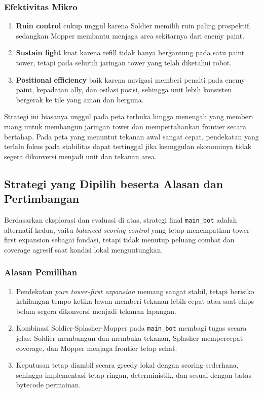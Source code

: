 \subsubsection{Efektivitas Mikro}

\begin{enumerate}
    \item \textbf{Ruin control} cukup unggul karena Soldier memilih ruin paling prospektif, sedangkan Mopper membantu menjaga area sekitarnya dari enemy paint.
    \item \textbf{Sustain fight} kuat karena refill tidak hanya bergantung pada satu paint tower, tetapi pada seluruh jaringan tower yang telah diketahui robot.
    \item \textbf{Positional efficiency} baik karena navigasi memberi penalti pada enemy paint, kepadatan ally, dan osilasi posisi, sehingga unit lebih konsisten bergerak ke tile yang aman dan berguna.
\end{enumerate}

Strategi ini biasanya unggul pada peta terbuka hingga menengah yang memberi ruang untuk membangun jaringan tower dan mempertahankan frontier secara bertahap. Pada peta yang menuntut tekanan awal sangat cepat, pendekatan yang terlalu fokus pada stabilitas dapat tertinggal jika keunggulan ekonominya tidak segera dikonversi menjadi unit dan tekanan area.

\subsection{Strategi yang Dipilih beserta Alasan dan Pertimbangan}

Berdasarkan eksplorasi dan evaluasi di atas, strategi final \texttt{main\_bot} adalah alternatif kedua, yaitu \textit{balanced scoring control} yang tetap menempatkan tower-first expansion sebagai fondasi, tetapi tidak menutup peluang combat dan coverage agresif saat kondisi lokal menguntungkan.

\subsubsection{Alasan Pemilihan}

\begin{enumerate}
    \item Pendekatan \textit{pure tower-first expansion} memang sangat stabil, tetapi berisiko kehilangan tempo ketika lawan memberi tekanan lebih cepat atau saat chips belum segera dikonversi menjadi tekanan lapangan.
    \item Kombinasi Soldier-Splasher-Mopper pada \texttt{main\_bot} membagi tugas secara jelas: Soldier membangun dan membuka tekanan, Splasher mempercepat coverage, dan Mopper menjaga frontier tetap sehat.
    \item Keputusan tetap diambil secara greedy lokal dengan scoring sederhana, sehingga implementasi tetap ringan, deterministik, dan sesuai dengan batas bytecode permainan.
\end{enumerate}

